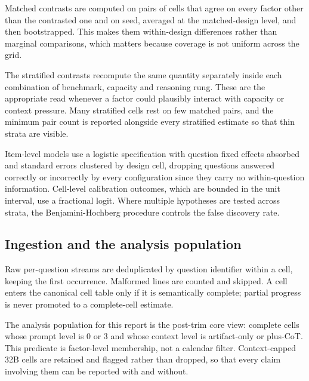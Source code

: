 Matched contrasts are computed on pairs of cells that agree on every factor other than the
contrasted one and on seed, averaged at the matched-design level, and then bootstrapped.
This makes them within-design differences rather than marginal comparisons, which matters
because coverage is not uniform across the grid.

The stratified contrasts recompute the same quantity separately inside each combination of
benchmark, capacity and reasoning rung. These are the appropriate read whenever a factor
could plausibly interact with capacity or context pressure. Many stratified cells rest on
few matched pairs, and the minimum pair count is reported alongside every stratified
estimate so that thin strata are visible.

Item-level models use a logistic specification with question fixed effects absorbed and
standard errors clustered by design cell, dropping questions answered correctly or
incorrectly by every configuration since they carry no within-question information.
Cell-level calibration outcomes, which are bounded in the unit interval, use a fractional
logit. Where multiple hypotheses are tested across strata, the Benjamini-Hochberg
procedure controls the false discovery rate.

\subsection{Ingestion and the analysis population}

Raw per-question streams are deduplicated by question identifier within a cell, keeping
the first occurrence. Malformed lines are counted and skipped. A cell enters the canonical
cell table only if it is semantically complete; partial progress is never promoted to a
complete-cell estimate.

The analysis population for this report is the post-trim core view: complete cells whose
prompt level is 0 or 3 and whose context level is artifact-only or plus-CoT. This
predicate is factor-level membership, not a calendar filter. Context-capped 32B cells are
retained and flagged rather than dropped, so that every claim involving them can be
reported with and without.

